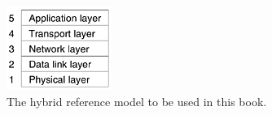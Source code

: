 \begin{figure}
   \centering
   \includegraphics[width=.2\textwidth]{images/01fig24.png}
   \caption{The hybrid reference model to be used in this book.}
   \label{fig:hybrid-model}
\end{figure}

